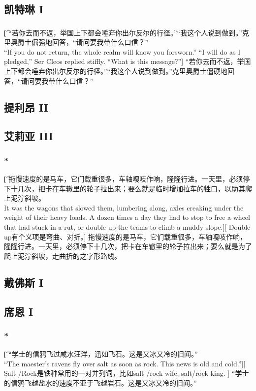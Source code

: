 \documentclass[12pt,a4paper]{article}
\begin{document}
\subsection{凯特琳 I}
\subsubsection{}\t[
	“若你去而不返，举国上下都会唾弃你出尔反尔的行径。”“我这个人说到做到。”克里奥爵士倔强地回答，“请问要我带什么口信？”\\
	“If you do not return, the whole realm will know you forsworn.” “I will do as I pledged,” Ser Cleos replied stiffly. “What is this message?”]
	“若你去而不返，举国上下都会唾弃你出尔反尔的行径。”“我这个人说到做到。”克里奥爵士僵硬地回答，“请问要我带什么口信？”
	
\subsection{提利昂 II}


\subsection{艾莉亚 III}
\subsubsection{\color{red}*}\t[
	拖慢速度的是马车，它们载重很多，车轴嘎吱作响，隆隆行进。一天里，必须停下十几次，把卡在车辙里的轮子拉出来；要么就是临时增加拉车的牲口，以助其爬上泥泞斜坡。\\
	It was the wagons that slowed them, lumbering along, axles creaking under the weight of their heavy loads. A dozen times a day they had to stop to free a wheel that had stuck in a rut, or double up the teams to climb a muddy slope.][
	Double up有个义项是弯曲、对折。]
	拖慢速度的是马车，它们载重很多，车轴嘎吱作响，隆隆行进。一天里，必须停下十几次，把卡在车辙里的轮子拉出来；要么就是为了爬上泥泞斜坡，走曲折的之字形路线。

\subsection{戴佛斯 I}

\subsection{席恩 I}
\subsubsection{\color{red}*}\t[
	“学士的信鸦飞过咸水汪洋，迅如飞石。这是又冰又冷的旧闻。”\\
	“The maester's ravens fly over salt as soon as rock. This news is old and cold.”][
	Salt /Rock是铁种常用的一对并列词，比如salt /rock wife, salt/rock king. ]
	“学士的信鸦飞越盐水的速度不亚于飞越岩石。这是又冰又冷的旧闻。”
	
\end{document}
